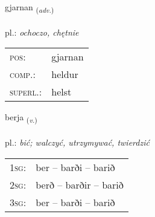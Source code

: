 \documentclass[frontgrid, backgrid]{flacards}\usepackage[]{graphicx}\usepackage[]{xcolor}
\begin{document}
\renewcommand{\flhead}{\vskip5pt \fboxsep=0pt {\small\bfseries\footnotesize Atviksorð | przysłówek}}
\renewcommand{\fcfoot}{\vskip5pt \fboxsep=0pt \hspace{2pt}{\small\bfseries\footnotesize 1K}}

\renewcommand{\blhead}{\vskip5pt {\small\bfseries\footnotesize Atviksorð | przysłówek }}
\renewcommand{\bcfoot}{\vskip5pt \hspace{2pt}{\small\bfseries\footnotesize 1K}}


{gjarnan \small{\textsubscript{(\textit{adv.})}} \\[1ex] %
\textphonetic{[cartnan]} \\
pl.: \emph{ochoczo, chętnie} \\  [2ex]
\renewcommand*{\arraystretch}{0.8}
\begin{tabular}{ll}
\textsc{pos}: & gjarnan \\ 
\textsc{comp.}: & heldur \\ 
\textsc{superl.}: & helst \\
\end{tabular}
}

\renewcommand{\flhead}{\vskip5pt \fboxsep=0pt {\small\bfseries\footnotesize Sagnorð | czasownik}}
\renewcommand{\fcfoot}{\vskip5pt \fboxsep=0pt \hspace{2pt}{\small\bfseries\footnotesize 1K}}

\renewcommand{\blhead}{\vskip5pt {\small\bfseries\footnotesize Sagnorð | czasownik }}
\renewcommand{\bcfoot}{\vskip5pt \hspace{2pt}{\small\bfseries\footnotesize 1K}}


{berja \small{\textsubscript{(\textit{v.})}} \\[1ex] %
\textphonetic{[pɛrja]} \\
pl.: \emph{bić; walczyć, utrzymywać, twierdzić} \\  [2ex]
\renewcommand*{\arraystretch}{0.8}
\begin{tabular}{p{1cm}l}
\textsc{1sg}: & ber -- barði -- barið \\ 
\textsc{2sg}: & berð -- barðir -- barið \\ 
\textsc{3sg}: & ber -- barði -- barið \\ 
\end{tabular}
}
\end{document}
